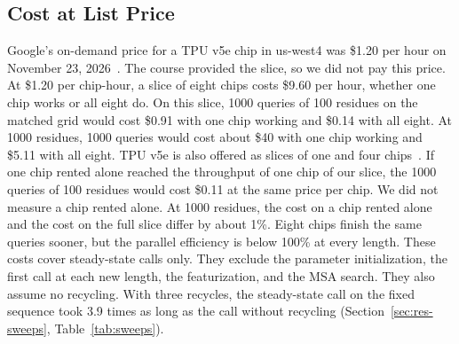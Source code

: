 \subsection{Cost at List Price}\label{sec:res-cost}
Google's on-demand price for a TPU v5e chip in us-west4 was \$1.20 per hour on November 23, 2026~\cite{googletpupricing}. %
The course provided the slice, so we did not pay this price.
At \$1.20 per chip-hour, a slice of eight chips costs \$9.60 per hour, whether one chip works or all eight do. %
On this slice, 1000 queries of 100 residues on the matched grid would cost \$0.91 with one chip working and \$0.14 with all eight. %
At 1000 residues, 1000 queries would cost about \$40 with one chip working and \$5.11 with all eight. %
TPU v5e is also offered as slices of one and four chips~\cite{googletpuv5e}.
If one chip rented alone reached the throughput of one chip of our slice, the 1000 queries of 100 residues would cost \$0.11 at the same price per chip. %
We did not measure a chip rented alone.
At 1000 residues, the cost on a chip rented alone and the cost on the full slice differ by about 1\%. %
Eight chips finish the same queries sooner, but the parallel efficiency is below 100\% at every length. %
These costs cover steady-state calls only. They exclude the parameter initialization, the first call at each new length,
the featurization, and the MSA search. They also assume no recycling.
With three recycles, the steady-state call on the fixed sequence took 3.9 times as long as the call without recycling (Section~\ref{sec:res-sweeps}, Table~\ref{tab:sweeps}). %

